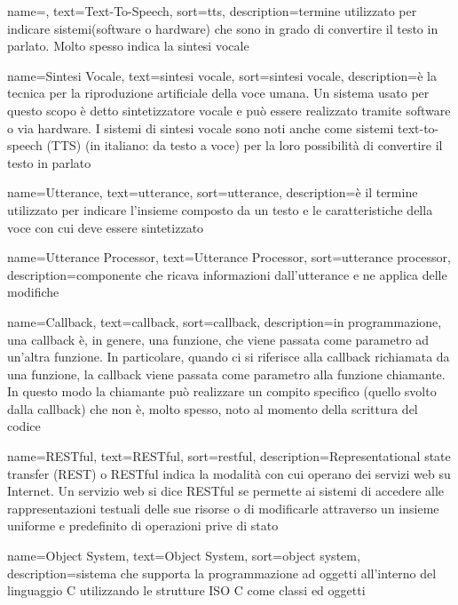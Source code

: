 {
	name=,
	text=Text-To-Speech,
	sort=tts,
	description={termine utilizzato per indicare sistemi(software o hardware) che sono in grado di convertire il testo in parlato. Molto spesso indica la sintesi vocale}
}

{
	name=Sintesi Vocale,
	text=sintesi vocale,
	sort=sintesi vocale,
	description={è la tecnica per la riproduzione artificiale della voce umana. Un sistema usato per questo scopo è detto sintetizzatore vocale e può essere realizzato tramite software o via hardware. I sistemi di sintesi vocale sono noti anche come sistemi text-to-speech (TTS) (in italiano: da testo a voce) per la loro possibilità di convertire il testo in parlato}
}

{
	name=Utterance,
	text=utterance,
	sort=utterance,
	description={è il termine utilizzato per indicare l'insieme composto da un testo e le caratteristiche della voce con cui deve essere sintetizzato}
}

{
	name=Utterance Processor,
	text=Utterance Processor,
	sort=utterance processor,
	description={componente che ricava informazioni dall'utterance e ne applica delle modifiche}
}

{
	name=Callback,
	text=callback,
	sort=callback,
	description={in programmazione, una callback è, in genere, una funzione, che viene passata come parametro ad un'altra funzione. In particolare, quando ci si riferisce alla callback richiamata da una funzione, la callback viene passata come parametro alla funzione chiamante. In questo modo la chiamante può realizzare un compito specifico (quello svolto dalla callback) che non è, molto spesso, noto al momento della scrittura del codice}
}

{
	name=RESTful,
	text=RESTful,
	sort=restful,
	description={Representational state transfer (REST) o RESTful indica la modalità con cui operano dei servizi web su Internet. Un servizio web si dice RESTful se permette ai sistemi di accedere alle rappresentazioni testuali delle sue risorse o di modificarle attraverso un insieme uniforme e predefinito di operazioni prive di stato}
}

{
	name=Object System,
	text=Object System,
	sort=object system,
	description={sistema che supporta la programmazione ad oggetti all'interno del linguaggio C utilizzando le strutture ISO C come classi ed oggetti}
}


